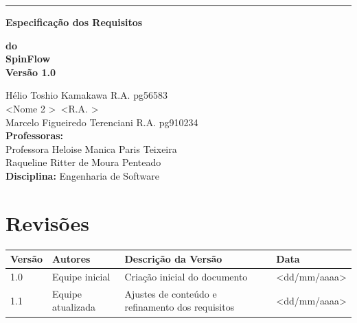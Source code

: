 \documentclass[12pt,a4paper]{article}
\newcommand{\ProjetoNome}{SpinFlow}
\newcommand{\VersaoDocumento}{1.0}
\newcommand{\ProfessoraA}{Professora Heloise Manica Paris Teixeira}
\newcommand{\ProfessoraB}{Raqueline Ritter de Moura Penteado}
\newcommand{\DisciplinaNome}{Engenharia de Software}
\newcommand{\AutorA}{Hélio Toshio Kamakawa R.A. pg56583}
\newcommand{\AutorB}{\textless Nome 2 \textgreater\ \textless R.A. \textgreater}
\newcommand{\AutorC}{Marcelo Figueiredo Terenciani R.A. pg910234}
\begin{document}
\begin{titlepage}

\noindent\rule{\textwidth}{0.8pt} %

\begin{flushright}
    {\Huge \textbf{Especificação dos Requisitos}}
\end{flushright}

\begin{flushright}
    {\Large \textbf{do}}\\[1.0cm]
    
    {\Huge \textbf{\ProjetoNome}}\\[1.2cm]
    
    {\Large \textbf{Versão \VersaoDocumento}}
\end{flushright}

\vspace{1.8cm}
\begin{flushleft}
    \AutorA\\
    \AutorB\\
    \AutorC\\[0.5cm]

    \textbf{Professoras:} \\
        \ProfessoraA\\
        \ProfessoraB\\[0.5cm]
    \textbf{Disciplina:} \DisciplinaNome
\end{flushleft}

\end{titlepage}

\tableofcontents
\newpage




\section*{Revisões}
\begin{longtable}{|p{2.5cm}|p{4cm}|p{5cm}|p{3cm}|}
\hline
\textbf{Versão} & \textbf{Autores} & \textbf{Descrição da Versão} & \textbf{Data} \\
\hline
1.0 & Equipe inicial & Criação inicial do documento & \textless dd/mm/aaaa\textgreater \\
\hline
1.1 & Equipe atualizada & Ajustes de conteúdo e refinamento dos requisitos & \textless dd/mm/aaaa\textgreater \\
\hline
\end{longtable}
\end{document}
